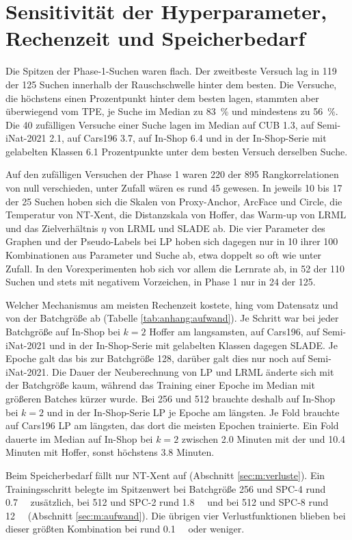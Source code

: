 \section{Sensitivität der Hyperparameter, Rechenzeit und Speicherbedarf}
\label{sec:e:sensitivitaet}
\label{sec:e:aufwand}

Die Spitzen der Phase-1-Suchen waren flach. Der zweitbeste Versuch lag in 119 der 125 Suchen innerhalb der Rauschschwelle hinter dem besten. Die Versuche, die höchstens einen Prozentpunkt hinter dem besten lagen, stammten aber überwiegend vom \ac{TPE}, je Suche im Median zu \qty{83}{\percent} und mindestens zu \qty{56}{\percent}. Die 40 zufälligen Versuche einer Suche lagen im Median auf \ac{CUB} \num{1.3}, auf Semi-iNat-2021 \num{2.1}, auf Cars196 \num{3.7}, auf In-Shop \num{6.4} und in der In-Shop-Serie mit gelabelten Klassen \num{6.1} Prozentpunkte unter dem besten Versuch derselben Suche.

Auf den zufälligen Versuchen der Phase 1 waren 220 der 895 Rangkorrelationen von null verschieden, unter Zufall wären es rund 45 gewesen. In jeweils 10 bis 17 der 25 Suchen hoben sich die Skalen von Proxy-Anchor, ArcFace und Circle, die Temperatur von \ac{NT-Xent}, die Distanzskala von Hoffer, das Warm-up von \ac{LRML} und das Zielverhältnis $\eta$ von \ac{LRML} und \ac{SLADE} ab. Die vier Parameter des Graphen und der Pseudo-Labels bei \ac{LP} hoben sich dagegen nur in 10 ihrer 100 Kombinationen aus Parameter und Suche ab, etwa doppelt so oft wie unter Zufall. In den Vorexperimenten hob sich vor allem die Lernrate ab, in 52 der 110 Suchen und stets mit negativem Vorzeichen, in Phase 1 nur in 24 der 125.

Welcher Mechanismus am meisten Rechenzeit kostete, hing vom Datensatz und von der Batchgröße ab (Tabelle \ref{tab:anhang:aufwand}). Je Schritt war bei jeder Batchgröße auf In-Shop bei $k=2$ Hoffer am langsamsten, auf Cars196, auf Semi-iNat-2021 und in der In-Shop-Serie mit gelabelten Klassen dagegen \ac{SLADE}. Je Epoche galt das bis zur Batchgröße 128, darüber galt dies nur noch auf Semi-iNat-2021. Die Dauer der Neuberechnung von \ac{LP} und \ac{LRML} änderte sich mit der Batchgröße kaum, während das Training einer Epoche im Median mit größeren Batches kürzer wurde. Bei 256 und 512 brauchte deshalb auf In-Shop bei $k=2$ und in der In-Shop-Serie \ac{LP} je Epoche am längsten. Je Fold brauchte auf Cars196 \ac{LP} am längsten, das dort die meisten Epochen trainierte. Ein Fold dauerte im Median auf In-Shop bei $k=2$ zwischen \num{2.0} Minuten mit der \UEBL und \num{10.4} Minuten mit Hoffer, sonst höchstens \num{3.8} Minuten.%

Beim Speicherbedarf fällt nur \ac{NT-Xent} auf (Abschnitt \ref{sec:m:verluste}). Ein Trainingsschritt belegte im Spitzenwert bei Batchgröße 256 und \ac{SPC}-4 rund \SI{0.7}{\giga\byte} zusätzlich, bei 512 und \ac{SPC}-2 rund \SI{1.8}{\giga\byte} und bei 512 und \ac{SPC}-8 rund \SI{12}{\giga\byte} (Abschnitt \ref{sec:m:aufwand}). Die übrigen vier Verlustfunktionen blieben bei dieser größten Kombination bei rund \SI{0.1}{\giga\byte} oder weniger.%

